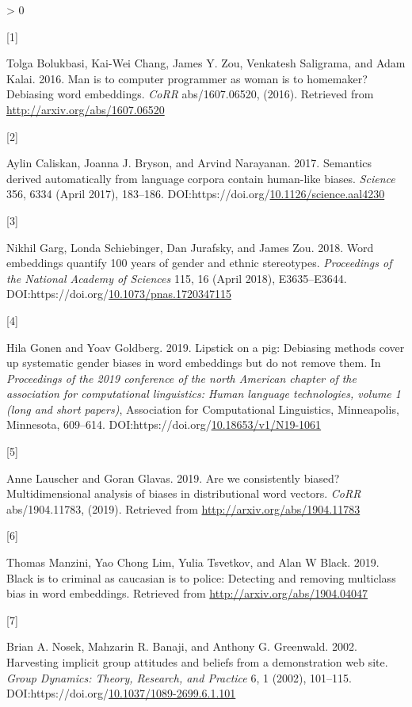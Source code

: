 \documentclass[
  12pt,
  dvipsnames,enabledeprecatedfontcommands]{scrartcl}
\newlength{\cslhangindent}
\newlength{\csllabelwidth}
\newenvironment{CSLReferences}[2] %
 {%
  \setlength{\parindent}{0pt}
  \ifodd #1 \everypar{\setlength{\hangindent}{\cslhangindent}}\ignorespaces\fi
  \ifnum #2 > 0
  \setlength{\parskip}{#2\baselineskip}
  \fi
 }%
 {}
\newcommand{\CSLLeftMargin}[1]{\parbox[t]{\csllabelwidth}{#1}}
\newcommand{\CSLRightInline}[1]{\parbox[t]{\linewidth - \csllabelwidth}{#1}\break}
\begin{document}
\hypertarget{refs}{}
\begin{CSLReferences}{0}{0}
\leavevmode\hypertarget{ref-Bolukbasi2016man}{}%
\CSLLeftMargin{{[}1{]} }
\CSLRightInline{Tolga Bolukbasi, Kai-Wei Chang, James Y. Zou, Venkatesh
Saligrama, and Adam Kalai. 2016. Man is to computer programmer as woman
is to homemaker? Debiasing word embeddings. \emph{CoRR} abs/1607.06520,
(2016). Retrieved from \url{http://arxiv.org/abs/1607.06520}}

\leavevmode\hypertarget{ref-Caliskan2017semanticsBiases}{}%
\CSLLeftMargin{{[}2{]} }
\CSLRightInline{Aylin Caliskan, Joanna J. Bryson, and Arvind Narayanan.
2017. Semantics derived automatically from language corpora contain
human-like biases. \emph{Science} 356, 6334 (April 2017), 183--186.
DOI:https://doi.org/\href{https://doi.org/10.1126/science.aal4230}{10.1126/science.aal4230}}

\leavevmode\hypertarget{ref-Garg2018years}{}%
\CSLLeftMargin{{[}3{]} }
\CSLRightInline{Nikhil Garg, Londa Schiebinger, Dan Jurafsky, and James
Zou. 2018. Word embeddings quantify 100 years of gender and ethnic
stereotypes. \emph{Proceedings of the National Academy of Sciences} 115,
16 (April 2018), E3635--E3644.
DOI:https://doi.org/\href{https://doi.org/10.1073/pnas.1720347115}{10.1073/pnas.1720347115}}

\leavevmode\hypertarget{ref-Gonen2019lipstick}{}%
\CSLLeftMargin{{[}4{]} }
\CSLRightInline{Hila Gonen and Yoav Goldberg. 2019. Lipstick on a pig:
{D}ebiasing methods cover up systematic gender biases in word embeddings
but do not remove them. In \emph{Proceedings of the 2019 conference of
the north {A}merican chapter of the association for computational
linguistics: Human language technologies, volume 1 (long and short
papers)}, Association for Computational Linguistics, Minneapolis,
Minnesota, 609--614.
DOI:https://doi.org/\href{https://doi.org/10.18653/v1/N19-1061}{10.18653/v1/N19-1061}}

\leavevmode\hypertarget{ref-Lauscher2019multidimensional}{}%
\CSLLeftMargin{{[}5{]} }
\CSLRightInline{Anne Lauscher and Goran Glavas. 2019. Are we
consistently biased? Multidimensional analysis of biases in
distributional word vectors. \emph{CoRR} abs/1904.11783, (2019).
Retrieved from \url{http://arxiv.org/abs/1904.11783}}

\leavevmode\hypertarget{ref-Manzini2019blackToCriminal}{}%
\CSLLeftMargin{{[}6{]} }
\CSLRightInline{Thomas Manzini, Yao Chong Lim, Yulia Tsvetkov, and Alan
W Black. 2019. Black is to criminal as caucasian is to police: Detecting
and removing multiclass bias in word embeddings. Retrieved from
\url{http://arxiv.org/abs/1904.04047}}

\leavevmode\hypertarget{ref-Nosek2002harvesting}{}%
\CSLLeftMargin{{[}7{]} }
\CSLRightInline{Brian A. Nosek, Mahzarin R. Banaji, and Anthony G.
Greenwald. 2002. Harvesting implicit group attitudes and beliefs from a
demonstration web site. \emph{Group Dynamics: Theory, Research, and
Practice} 6, 1 (2002), 101--115.
DOI:https://doi.org/\href{https://doi.org/10.1037/1089-2699.6.1.101}{10.1037/1089-2699.6.1.101}}

\end{CSLReferences}
\end{document}
